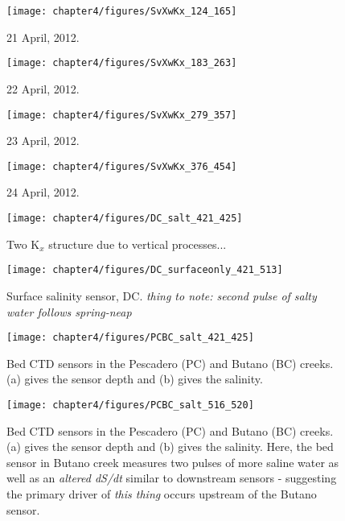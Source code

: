 \begin{figure}
	\texttt{[image: chapter4/figures/SvXwKx\_124\_165]} 
\caption{21 April, 2012. } \label{fig:Kx421}
\end{figure}

\begin{figure}
	\texttt{[image: chapter4/figures/SvXwKx\_183\_263]} 
\caption{22 April, 2012. } \label{fig:Kx422}
\end{figure}



\begin{figure}
	\texttt{[image: chapter4/figures/SvXwKx\_279\_357]} 
\caption{23 April, 2012. } \label{fig:Kx423}
\end{figure}



\begin{figure}
	\texttt{[image: chapter4/figures/SvXwKx\_376\_454]} 
\caption{24 April, 2012.} \label{fig:Kx424}
\end{figure}



\begin{figure}
	\texttt{[image: chapter4/figures/DC\_salt\_421\_425]}
	\caption{Two K$_x$ structure due to vertical processes...} \label{fig:SDCApr2012}
\end{figure}


\begin{figure}
	\texttt{[image: chapter4/figures/DC\_surfaceonly\_421\_513]}
	\caption{Surface salinity sensor, DC. \emph{thing to note: second pulse of salty water follows spring-neap}} \label{fig:SsurfLT}
\end{figure}


\begin{figure}
	\texttt{[image: chapter4/figures/PCBC\_salt\_421\_425]}
	\caption{Bed CTD sensors in the Pescadero (PC) and Butano (BC) creeks. (a) gives the sensor depth and (b) gives the salinity.} \label{fig:PCBC421:425}
\end{figure}



\begin{figure}
	\texttt{[image: chapter4/figures/PCBC\_salt\_516\_520]}
	\caption{Bed CTD sensors in the Pescadero (PC) and Butano (BC) creeks. (a) gives the sensor depth and (b) gives the salinity. Here, the bed sensor in Butano creek measures two pulses of more saline water as well as an \emph{altered dS/dt} similar to downstream sensors - suggesting the primary driver of \emph{this thing} occurs upstream of the Butano sensor.}  \label{fig:PCBC511:516}
\end{figure}



